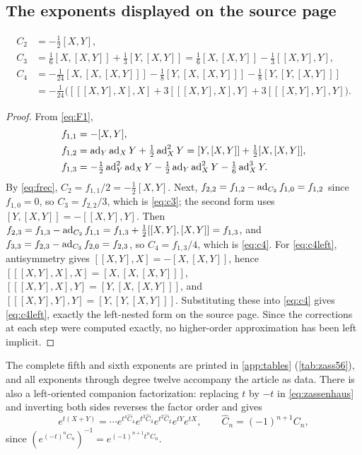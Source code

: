 \subsection{The exponents displayed on the source page}
\begin{proposition}\label{prop:zassdisplayed}
\begin{align}
 C_2&=-\tfrac12[X,Y],\label{eq:c2}\\
 C_3&=\tfrac16[X,[X,Y]]+\tfrac13[Y,[X,Y]]
     =\tfrac16[X,[X,Y]]-\tfrac13[[X,Y],Y],\label{eq:c3}\\
 C_4&=-\tfrac1{24}[X,[X,[X,Y]]]-\tfrac18[Y,[X,[X,Y]]]-\tfrac18[Y,[Y,[X,Y]]]
 \label{eq:c4}\\
    &=-\tfrac1{24}\bigl([[[X,Y],X],X]+3[[[X,Y],X],Y]+3[[[X,Y],Y],Y]\bigr).
 \label{eq:c4left}
\end{align}
\end{proposition}
\begin{proof}
From \eqref{eq:F1},
\begin{align*}
 f_{1,1}&=-[X,Y],\\
 f_{1,2}&=\operatorname{ad}_Y\operatorname{ad}_XY+\tfrac12\operatorname{ad}_X^2Y=[Y,[X,Y]]+\tfrac12[X,[X,Y]],\\
 f_{1,3}&=-\tfrac12\operatorname{ad}_Y^2\operatorname{ad}_XY-\tfrac12\operatorname{ad}_Y\operatorname{ad}_X^2Y-\tfrac16\operatorname{ad}_X^3Y.
\end{align*}
By \eqref{eq:frec}, $C_2=f_{1,1}/2=-\tfrac12[X,Y]$. Next,
$f_{2,2}=f_{1,2}-\operatorname{ad}_{C_2}f_{1,0}=f_{1,2}$ since $f_{1,0}=0$, so
$C_3=f_{2,2}/3$, which is \eqref{eq:c3}; the second form uses
$[Y,[X,Y]]=-[[X,Y],Y]$. Then
$f_{2,3}=f_{1,3}-\operatorname{ad}_{C_2}f_{1,1}=f_{1,3}+\tfrac12[[X,Y],[X,Y]]=f_{1,3}$,
and $f_{3,3}=f_{2,3}-\operatorname{ad}_{C_3}f_{2,0}=f_{2,3}$, so $C_4=f_{1,3}/4$, which is
\eqref{eq:c4}. For \eqref{eq:c4left}, antisymmetry gives
$[[X,Y],X]=-[X,[X,Y]]$, hence $[[[X,Y],X],X]=[X,[X,[X,Y]]]$,
$[[[X,Y],X],Y]=[Y,[X,[X,Y]]]$, and $[[[X,Y],Y],Y]=[Y,[Y,[X,Y]]]$.
Substituting these into \eqref{eq:c4} gives \eqref{eq:c4left}, exactly the
left-nested form on the source page. Since the corrections at each step
were computed exactly, no higher-order approximation has been left implicit.
\end{proof}
The complete fifth and sixth exponents are printed in \cref{app:tables}
(\cref{tab:zass56}), and all exponents through degree twelve accompany the
article as data. There is also a left-oriented companion factorization:
replacing $t$ by $-t$ in \eqref{eq:zassenhaus} and inverting both sides
reverses the factor order and gives
\begin{equation}\label{eq:zassleft}
 e^{t(X+Y)}=\cdots e^{t^4\widehat C_4}e^{t^3\widehat C_3}e^{t^2\widehat C_2}e^{tY}e^{tX},
 \qquad \widehat C_n=(-1)^{n+1}C_n,
\end{equation}
since $(e^{(-t)^nC_n})^{-1}=e^{(-1)^{n+1}t^nC_n}$.


